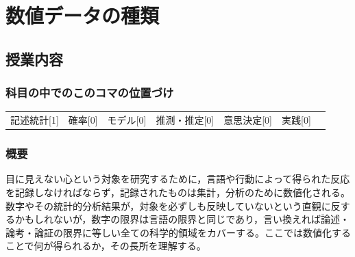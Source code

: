 \section{数値データの種類}
\label{D1_lesson03}

\subsection{授業内容}
\subsubsection{科目の中でのこのコマの位置づけ}
\begin{tabular}[t]{ccccccc}
    記述統計[1] & 確率[0] & モデル[0] & 推測・推定[0] & 意思決定[0] & 実践[0]
\end{tabular}
\subsubsection{概要}
目に見えない心という対象を研究するために，言語や行動によって得られた反応を記録しなければならず，記録されたものは集計，分析のために数値化される。数字やその統計的分析結果が，対象を必ずしも反映していないという直観に反するかもしれないが，数字の限界は言語の限界と同じであり，言い換えれば論述・論考・論証の限界に等しい全ての科学的領域をカバーする。ここでは数値化することで何が得られるか，その長所を理解する。
